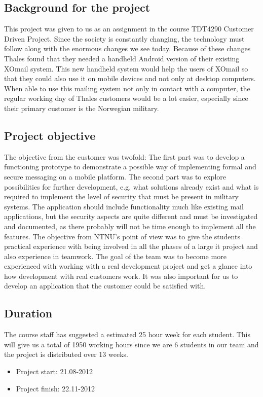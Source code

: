 \subsection{Background for the project}
This project was given to us as an assignment in the course TDT4290 Customer Driven Project. Since the society is constantly changing, the technology must follow along with the enormous changes we see today. Because of these changes Thales found that they needed a handheld Android version of their existing XOmail system. This new handheld system would help the users of XOmail so that they could also use it on mobile devices and not only at desktop computers. When able to use this mailing system not only in contact with a computer, the regular working day of Thales customers would be a lot easier, especially since their primary customer is the Norwegian military.

\subsection{Project objective}
The objective from the customer was twofold: The first part was to develop a functioning prototype to demonstrate a possible way of implementing formal and secure messaging on a mobile platform. The second part was to explore possibilities for further development, e.g. what solutions already exist and what is required to implement the level of security that must be present in military systems. The application should include functionality much like existing mail applications, but the security aspects are quite different and must be investigated and documented, as there probably will not be time enough to implement all the features.
\newline
\newline
The objective from NTNU’s point of view was to give the students practical experience with being involved in all the phases of a large \gls{it} project and also experience in teamwork. 
\newline
\newline
The goal of the team was to become more experienced with working with a real development project and get a glance into how development with real customers work. It was also important for us to develop an application that the customer could be satisfied with. 


\subsection{Duration}
The course staff has suggested a estimated 25 hour week for each student. This will give us a total of 1950 working hours since we are 6 students in our team and the project is distributed over 13 weeks.

\begin{itemize}
\item{}Project start: 21.08-2012
\item{}Project finish: 22.11-2012
\end{itemize}

